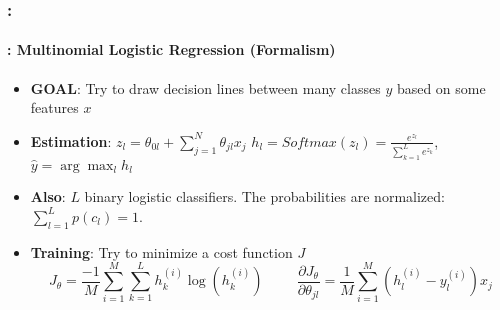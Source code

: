 \documentclass[xcolor=table]{beamer}
\begin{document}
\begin{frame}
	\frametitle{\insertshortsubtitle: \insertsection}
	\framesubtitle{\insertsubsection: Multinomial Logistic Regression (Formalism)}
	
	\begin{minipage}{0.7\textwidth} 
		\begin{itemize}
			\item \textbf{GOAL}: Try to draw decision lines between many classes $ y $ based on some features $ x $
			\item \textbf{Estimation}: $ z_l = \theta_{0l} + \sum_{j=1}^{N} \theta_{jl} x_j $
			$ h_l = Softmax(z_l) = \frac{e^{z_l}}{\sum_{k=1}^{L} e^{z_k}}$, $ \hat{y} = \arg\max_{l} h_l$
			\item \textbf{Also}: $ L $ binary logistic classifiers. 
			The probabilities are normalized: $ \sum_{l=1}^{L} p(c_l) = 1$.
		\end{itemize}
	\end{minipage}
	\begin{minipage}{0.29\textwidth} 
	\end{minipage}

	\begin{itemize}
		\item \textbf{Training}: Try to minimize a cost function $ J $
		\[J_\theta = \frac{-1}{M} \sum\limits_{i=1}^{M} \sum_{k=1}^{L} h^{(i)}_k \log(h^{(i)}_k)
		\hspace{1cm}
		\frac{\partial J_\theta}{\partial \theta_{jl}} = \frac{1}{M} \sum\limits_{i=1}^{M} (h_l^{(i)} - y_l^{(i)}) x_j
		\]
	\end{itemize}
	
\end{frame}
\end{document}
